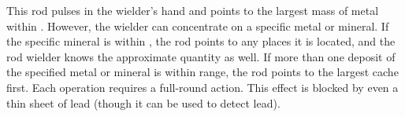 \begin{comment}
The following other functions of the rod also have no limit on the number of times they can be employed.
\begin{itemize}
\item Climbing pole/ladder. When button 4 is pushed, a spike that can anchor in granite is extruded from the ball, while the other end sprouts three sharp hooks. The rod lengthens to anywhere between 5 and 50 feet in a single round, stopping when button 4 is pushed again. Horizontal bars three inches long fold out from the sides, 1 foot apart, in staggered progression. The rod is firmly held by the spike and hooks and can bear up to 4,000 pounds. The wielder can retract the pole by pushing button 5.
\item The ladder function can be used to force open doors. The wielder plants the rod's base 30 feet or less from the portal to be forced and in line with it, then pushes button 4. The force exerted has a Strength of \plus12.
\item When button 6 is pushed, the rod indicates magnetic north and gives the wielder a knowledge of his approximate depth beneath the surface or height above it.
\end{itemize}

Strong enchantment, evocation, necromancy, and transmutation; CL 19th; Craft Rod, Craft Magic Arms and Armor, inflict light wounds, bull's strength, flame blade, hold person, fear; Price 70,000 gp.
\end{comment}

 This rod pulses in the wielder's hand and points to the largest mass of metal within . However, the wielder can concentrate on a specific metal or mineral. If the specific mineral is within , the rod points to any places it is located, and the rod wielder knows the approximate quantity as well. If more than one deposit of the specified metal or mineral is within range, the rod points to the largest cache first. Each operation requires a full-round action. This effect is blocked by even a thin sheet of lead (though it can be used to detect lead).


